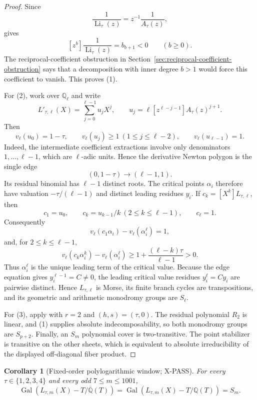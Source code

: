 \documentclass[11pt]{article}
\theoremstyle{keio}
\newtheorem{corollary}[theorem]{Corollary}
\theoremstyle{definition}
\theoremstyle{remark}
\newcommand{\Q}{\mathbb Q}
\newcommand{\Gal}{\operatorname{Gal}}
\newcommand{\XPASS}{\textcolor{keioxblue}{\textsf{X-PASS}}}
\begin{document}
\begin{proof}
Since
\[
\frac1{\operatorname{Li}_\tau(z)}
=z^{-1}\frac1{A_\tau(z)},
\]
 gives
\[
[z^b]\frac1{\operatorname{Li}_\tau(z)}=b_{b+1}<0
\qquad(b\ge0).
\]
The reciprocal-coefficient obstruction in
Section~\ref{sec:reciprocal-coefficient-obstruction} says that a decomposition
with inner degree $b>1$ would force this coefficient to vanish. This proves
(1).

For (2), work over $\Q_\ell$ and write
\[
L'_{\tau,\ell}(X)=\sum_{j=0}^{\ell-1}u_jX^j,
\qquad
u_j=\ell[z^{\ell-j-1}]A_\tau(z)^{j+1}.
\]
Then
\[
v_\ell(u_0)=1-\tau,
\qquad v_\ell(u_j)\ge1\ (1\le j\le\ell-2),
\qquad v_\ell(u_{\ell-1})=1.
\]
Indeed, the intermediate coefficient extractions involve only denominators
$1,\ldots,\ell-1$, which are $\ell$-adic units. Hence the derivative Newton
polygon is the single edge
\[
(0,1-\tau)\longrightarrow(\ell-1,1).
\]
Its residual binomial has $\ell-1$ distinct roots. The critical points
$\alpha_i$ therefore have valuation $-\tau/(\ell-1)$ and distinct leading
residues $y_i$. If $c_k=[X^k]L_{\tau,\ell}$, then
\[
c_1=u_0,\qquad c_k=u_{k-1}/k\ (2\le k\le\ell-1),
\qquad c_\ell=1.
\]
Consequently
\[
v_\ell(c_1\alpha_i)-v_\ell(\alpha_i^\ell)=1,
\]
and, for $2\le k\le\ell-1$,
\[
v_\ell(c_k\alpha_i^k)-v_\ell(\alpha_i^\ell)
\ge1+\frac{(\ell-k)\tau}{\ell-1}>0.
\]
Thus $\alpha_i^\ell$ is the unique leading term of the critical value.
Because the edge equation gives $y_i^{\ell-1}=C\ne0$, the leading critical
value residues $y_i^\ell=Cy_i$ are pairwise distinct. Hence
$L_{\tau,\ell}$ is Morse, its finite branch cycles are transpositions, and
its geometric and arithmetic monodromy groups are $S_\ell$.

For (3), apply  with $r=2$ and $(h,s)=(\tau,0)$.
The residual polynomial $R_2$ is linear, and (1) supplies absolute
indecomposability, so both monodromy groups are $S_{p+2}$. Finally, an
$S_m$ polynomial cover is two-transitive. The point stabilizer is transitive
on the other sheets, which is equivalent to absolute irreducibility of the
displayed off-diagonal fiber product.
\end{proof}

\begin{corollary}[Fixed-order polylogarithmic window; \XPASS]
\label{cor:polylog-window}
For every $\tau\in\{1,2,3,4\}$ and every odd $7\le m\le1001$,
\begin{equation}
\boxed{
\Gal(L_{\tau,m}(X)-T/\overline{\Q}(T))
=\Gal(L_{\tau,m}(X)-T/\Q(T))=S_m.}
\label{eq:polylog-window}
\end{equation}
\end{corollary}
\end{document}

